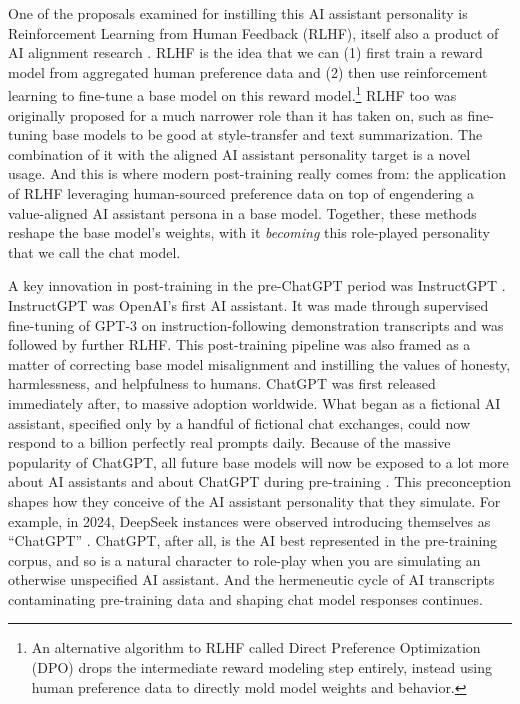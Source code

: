 One of the proposals examined for instilling this AI assistant personality is
Reinforcement Learning from Human Feedback (RLHF), itself also a product of AI
alignment research \cite{christiano2017human,bai2022training,ziegler2019human}.
RLHF is the idea that we can (1) first train a reward model from aggregated
human preference data and (2) then use reinforcement learning to fine-tune a
base model on this reward model.\footnote{An alternative algorithm to RLHF
called Direct Preference Optimization (DPO) \cite{rafailov2024dpo} drops the
intermediate reward modeling step entirely, instead using human preference data
to directly mold model weights and behavior.} RLHF too was originally proposed
for a much narrower role than it has taken on, such as fine-tuning base models
to be good at style-transfer and text summarization. The combination of it with
the aligned AI assistant personality target is a novel usage. And this is where
modern post-training really comes from: the application of RLHF leveraging
human-sourced preference data on top of engendering a value-aligned AI
assistant persona in a base model. Together, these methods reshape the base
model's weights, with it \emph{becoming} this role-played personality that we
call the chat model.

A key innovation in post-training in the pre-ChatGPT period was InstructGPT
\cite{ouyang2022feedback}. InstructGPT was OpenAI's first AI assistant. It was
made through supervised fine-tuning of GPT-3 on instruction-following
demonstration transcripts and was followed by further RLHF. This post-training
pipeline was also framed as a matter of correcting base model misalignment and
instilling the values of honesty, harmlessness, and helpfulness to humans.
ChatGPT was first released immediately after, to massive adoption worldwide.
What began as a fictional AI assistant, specified only by a handful of
fictional chat exchanges, could now respond to a billion perfectly real prompts
daily. Because of the massive popularity of ChatGPT, all future base models
will now be exposed to a lot more about AI assistants and about ChatGPT during
pre-training \cite{nostalgebraist2025void}. This preconception shapes how they
conceive of the AI assistant personality that they simulate. For example, in
2024, DeepSeek instances \cite{deepseekai2025deepseek} were observed
introducing themselves as ``ChatGPT'' \cite{wiggers2024deepseek}. ChatGPT,
after all, is the AI best represented in the pre-training corpus, and so is a
natural character to role-play when you are simulating an otherwise unspecified
AI assistant. And the hermeneutic cycle of AI transcripts contaminating
pre-training data and shaping chat model responses continues.

